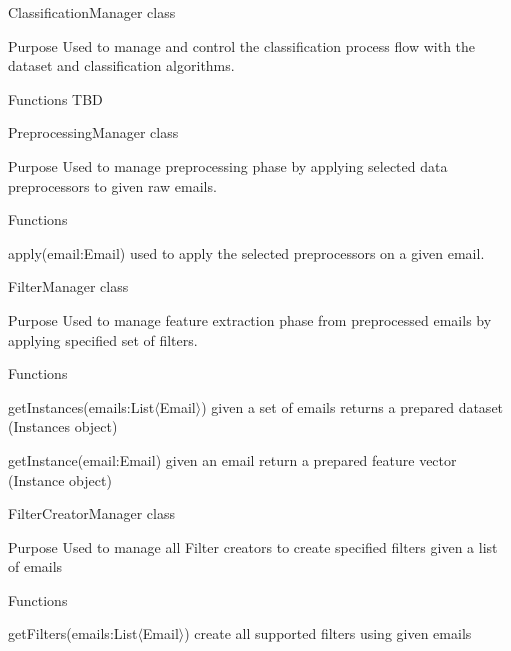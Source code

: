 \documentclass[12pt]{article}
\newenvironment{my_itemize}
{\begin{itemize}
  \setlength{\itemsep}{0cm}
  \setlength{\parskip}{0cm}}
{\end{itemize}}
\newenvironment{my_desc}
{\begin{description}
  \setlength{\itemsep}{0cm}
  \setlength{\parskip}{0cm}}
{\end{description}}
\begin{document}
\begin{my_itemize}
  \item ClassificationManager class
  \begin{my_desc}
    \item[Purpose] Used to manage and control the classification process flow
      with the dataset and classification algorithms.
    \item[Functions] TBD
  \end{my_desc}
  \item PreprocessingManager class
  \begin{my_desc}
    \item[Purpose] Used to manage preprocessing phase by applying selected data preprocessors
      to given raw emails.
    \item[Functions] \hfill
    \begin{my_itemize}
      \item apply(email:Email) used to apply the selected preprocessors on a given email.
    \end{my_itemize}
  \end{my_desc}

  \item FilterManager class
  \begin{my_desc}
    \item[Purpose] Used to manage feature extraction phase from preprocessed emails by applying
      specified set of filters.
    \item[Functions] \hfill
    \begin{my_itemize}
      \item getInstances(emails:List$\langle$Email$\rangle$) given a set of emails returns a prepared dataset (Instances object)
      \item getInstance(email:Email) given an email return a prepared feature vector (Instance object)
    \end{my_itemize}

  \end{my_desc}

  \item FilterCreatorManager class
  \begin{my_desc}
    \item[Purpose] Used to manage all Filter creators to create specified filters given a list of emails
    \item[Functions] \hfill
    \begin{my_itemize}
      \item getFilters(emails:List$\langle$Email$\rangle$) create all supported filters using given emails
    \end{my_itemize}


\end{my_desc}
\end{my_itemize}
\end{document}
